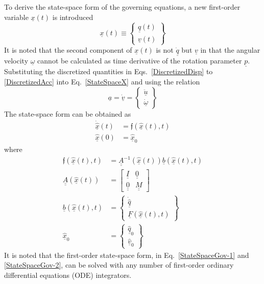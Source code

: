 \documentclass{aiaa-tc}
\newcommand{\tens}[1]{\underline{\underline{#1}}}
\renewcommand{\vec}[1]{\underline{#1}}
\begin{document}
To derive the state-space form of the governing equations, a new first-order variable $\vec{x}(t)$ is introduced
\begin{equation}
    \label{StateSpaceX}
    \vec{x}(t) \equiv \begin{Bmatrix}
    \vec{q}(t) \\
    \vec{v}(t)
    \end{Bmatrix} 
\end{equation}
It is noted that the second component of $\vec{x}(t)$ is not $\vec{\dot{q}}$ but $\vec{v}$ in that the angular velocity $\vec{\omega}$ cannot be calculated as time derivative of the rotation parameter $\vec{p}$. Substituting the discretized quantities in Eqs.~\eqref{DiscretizedDisp} to \eqref{DiscretizedAcc} into Eq.~\eqref{StateSpaceX} and using the relation
\begin{equation}
    \label{AccVel}
    \vec{a} = \vec{\dot{v}} = \begin{Bmatrix}
    \vec{\ddot{u}} \\
    \vec{\dot{\omega}}
    \end{Bmatrix}
\end{equation}
The state-space form can be obtained as
\begin{align}
    \label{StateSpaceGov-1}
    \dot{\hat{\vec{x}}}(t) &= \mathfrak{f}(\hat{\vec{x}}(t),t) \\
    \label{StateSpaceGov-2}
    \hat{\vec{x}}(0) &= \hat{\vec{x}}_0
\end{align}
where
\begin{align}
    \label{StateSpaceGov-3}
    \mathfrak{f}(\hat{\vec{x}}(t),t) &= \tens{A}^{-1} (\hat{\vec{x}}(t)) \vec{b}(\hat{\vec{x}}(t),t) \\
    \label{StateSpaceGov-4}
    \tens{A} (\hat{\vec{x}}(t)) &= \begin{bmatrix}
    \tens{I} & \tens{0} \\
    \tens{0} & \tens{M}
    \end{bmatrix}  \\
    \label{StateSpaceGov-5}
    \vec{b}(\hat{\vec{x}}(t),t) &= \begin{Bmatrix}
    \dot{\hat{\vec{q}}} \\
    \vec{F}(\hat{\vec{x}}(t),t)
    \end{Bmatrix} \\
    \label{StateSpaceGov-6}
    \hat{\vec{x}}_0 &= \begin{Bmatrix}
    \hat{\vec{q}}_0 \\
    \hat{\vec{v}}_0
    \end{Bmatrix}
\end{align}
It is noted that the first-order state-space form, in Eq.~\eqref{StateSpaceGov-1} and \eqref{StateSpaceGov-2}, can be solved with any number of first-order ordinary differential equations (ODE) integrators. 
\end{document}
